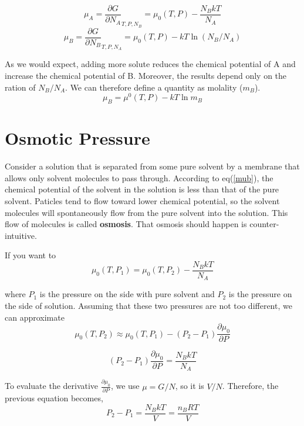 \begin{equation}
\mu_A = \frac{\partial G}{\partial N_A}_{T, P, N_B} = \mu_0(T, P) - \frac{N_BkT}{N_A}  
\end{equation}
\begin{equation}
\mu_B = \frac{\partial G}{\partial N_B}_{T, P, N_A} = \mu_0(T, P) - kT\ln(N_B/N_A)  
\end{equation}

As we would expect, adding more solute reduces the chemical potential of A and increase the chemical potential of B. Moreover, the results depend only on the ration of $N_B/N_A$. We can therefore define a quantity as molality ($m_B$). 
\begin{equation}\label{mub}
\mu_B = \mu^0(T, P) - kT\ln m_B  
\end{equation}

\section{Osmotic Pressure}
Consider a solution that is separated from some pure solvent by a membrane that allows only solvent molecules to pass through. According to eq(\ref{mub}), the chemical potential of the solvent in the solution is less than that of the pure solvent. Paticles tend to flow toward lower chemical potential, so the solvent molecules will spontaneously flow from the pure solvent into the solution. This flow of molecules is called \textbf{osmosis}. That osmosis should happen is counter-intuitive. 

If you want to 
\begin{equation}\label{mub}
\mu_0(T, P_1) = \mu_0(T, P_2) - \frac{N_BkT}{N_A}  
\end{equation}

where $P_1$ is the pressure on the side with pure solvent and $P_2$ is the pressure on the side of solution. Assuming that these two pressures are not too different, we can approximate
\begin{equation}\label{mub}
\mu_0(T, P_2) \approx \mu_0(T, P_1) - (P_2 - P_1) \frac{\partial \mu_0}{\partial P}  
\end{equation}

\begin{equation}
    (P_2 - P_1)\frac{\partial \mu_0}{\partial P} = \frac{N_BkT}{N_A}
\end{equation}

To evaluate the derivative $\frac{\partial \mu_0}{\partial P}$, we use $\mu = G/N$, so it is $V/N$. 
Therefore, the previous equation becomes,
\begin{equation}
    P_2 - P_1 = \frac{N_BkT}{V} = \frac{n_BRT}{V}
\end{equation}

